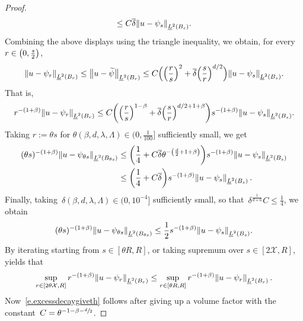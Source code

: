 \documentclass[11pt]{article} %
\numberwithin{equation}{section}
\theoremstyle{definition}
\let\originalleft\left
\let\originalright\right
\renewcommand{\left}{\mathopen{}\mathclose\bgroup\originalleft}
\renewcommand{\right}{\aftergroup\egroup\originalright}
\renewcommand*{\tilde}{\widetilde}
\newcommand{\X}{\mathcal{X}}
\begin{document}
\begin{proof}
\begin{align*}
\leq C \overline{\delta} \left\| u - \psi_s \right\|_{\underline{L}^2(B_{s})}.
\end{align*}
Combining the above displays using the triangle inequality, we obtain, for every $r\in \left(0,\tfrac s2 \right)$, 
\begin{equation*}
\left\| u - \psi_r \right\|_{\underline{L}^2(B_{r})}
\leq
\bigl\| u - \tilde{\psi} \bigr\|_{\underline{L}^2(B_{r})}
\leq 
C \Bigl( \left( \frac rs \right)^2 
+ \overline{\delta} \left( \frac sr \right)^{d/2}\Bigr) 
\left\| u - \psi_s \right\|_{\underline{L}^2(B_{s})}.
\end{equation*}
That is, 
\begin{equation*}
r^{-(1+\beta)} \left\| u - \psi_r \right\|_{\underline{L}^2(B_{r})}
\leq
C \biggl( 
\left( \frac rs \right)^{1-\beta} 
+ \overline{\delta} \left( \frac sr \right)^{d/2+1+\beta}\biggr) 
s^{-(1+\beta)} \left\| u - \psi_s \right\|_{\underline{L}^2(B_{s})}.
\end{equation*}
Taking $r:=\theta s$ for $\theta(\beta,d,\lambda,\Lambda) \in (0,\frac1{100}]$ sufficiently small, we get
\begin{align*}
(\theta s)^{-(1+\beta)} \left\| u - \psi_{\theta s} \right\|_{\underline{L}^2(B_{\theta s})}
&
\leq
\biggl( \frac 14 + C \overline{\delta} \theta ^{-\left(\frac d2+1+\beta\right)}\biggr) 
s^{-(1+\beta)} \left\| u - \psi_s \right\|_{\underline{L}^2(B_{s})}
\\ & 
\leq
\biggl( \frac 14 + C \overline{\delta} \biggr) 
s^{-(1+\beta)} \left\| u - \psi_s \right\|_{\underline{L}^2(B_{s})}
\,.
\end{align*}
Finally, taking~$\delta(\beta, d,\lambda,\Lambda)\in (0,10^{-4}]$ sufficiently small, so that~$\delta^{\frac1{d+6}} C \leq \frac14$, we obtain
\begin{equation*}
(\theta s)^{-(1+\beta)} \left\| u - \psi_{\theta s} \right\|_{\underline{L}^2(B_{\theta s})}
\leq 
\frac12 s^{-(1+\beta)} \left\| u - \psi_s \right\|_{\underline{L}^2(B_{s})}.
\end{equation*}
By iterating starting from $s \in [\theta R,R]$, or taking supremum over $s \in [2\X,R]$, yields that
\begin{equation}
\label{e.excessdecaygiveth.pre}
\sup_{r \in [2\theta \X,R]}
r^{-(1+\beta)} \left\| u - \psi_{r} \right\|_{\underline{L}^2(B_{r})}
\leq 
\sup_{r \in [\theta R,R]} r^{-(1+\beta)} \left\| u - \psi_r \right\|_{\underline{L}^2(B_{r})}\,.
\end{equation}
Now~\eqref{e.excessdecaygiveth} follows after giving up a volume factor with the constant~$C = \theta^{-1-\beta-\sfrac d2}$. 


\end{proof}
\end{document}
